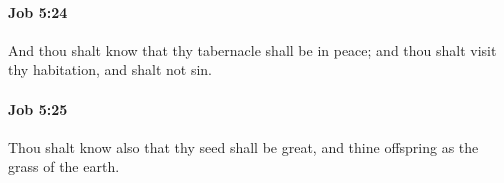 		\paragraph{Job 5:24} %
			\label{JOB-5-24}

			And thou shalt know that thy tabernacle shall be in peace; and thou shalt visit thy habitation, and shalt not sin.


		\paragraph{Job 5:25} %
			\label{JOB-5-25}

			Thou shalt know also that thy seed shall be great, and thine offspring as the grass of the earth.


